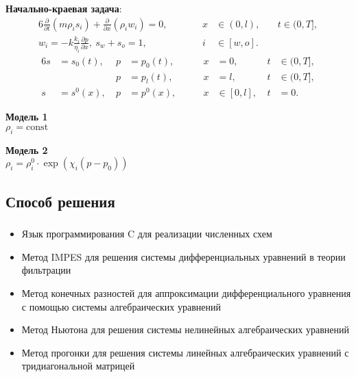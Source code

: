 \begin{frame}
\frametitle{\insertsection}
\framesubtitle{\insertsubsection}

\textbf{Начально-краевая задача}:
\begin{alignat*}{6}
    \frac{\partial}{\partial t} ( m \rho_i s_i )
    + \frac{\partial}{\partial x} ( \rho_i w_i ) = 0, &
    \qquad & x &\in (0, l), \ && t \in (0, T],
    \\
    w_i = - k \frac{k_i}{\eta_i} \frac{\partial p}{\partial x}, \
    s_w + s_o = 1, &
    & i &\in [w, o]. &&
\end{alignat*}
\vspace{-0.5cm}
\begin{alignat*}{6}
    s &= s_0(t), \ & p &= p_0(t),
    & \qquad x &= 0, \ & t &\in (0, T],
    \\
    & & p &= p_l(t),
    & \qquad x &= l, & t &\in (0, T],
    \\
    s &= s^0(x), \ & p &= p^0(x),
    & \qquad x &\in [0, l], \ & t &= 0.
\end{alignat*}

\begin{minipage}[t]{0.47\linewidth}
\textbf{Модель 1} \\
$\rho_i = \mathrm{const}$
\end{minipage}
\hfill
\begin{minipage}[t]{0.47\linewidth}
\textbf{Модель 2} \\
$\rho_i = \rho^0_i \cdot \exp \left( \chi_i \left( p - p_0 \right) \right)$
\end{minipage}
\end{frame}


\subsection{Способ решения}

\begin{frame}
\frametitle{\insertsection}
\framesubtitle{\insertsubsection}

\begin{itemize}
    \item Язык программирования C для реализации численных схем
    \item Метод IMPES для решения системы дифференциальных уравнений в теории фильтрации
    \item Метод конечных разностей для аппроксимации дифференциального уравнения с помощью системы алгебраических уравнений
    \item Метод Ньютона для решения системы нелинейных алгебраических уравнений
    \item Метод прогонки для решения системы линейных алгебраических уравнений с тридиагональной матрицей
\end{itemize}
\end{frame}

